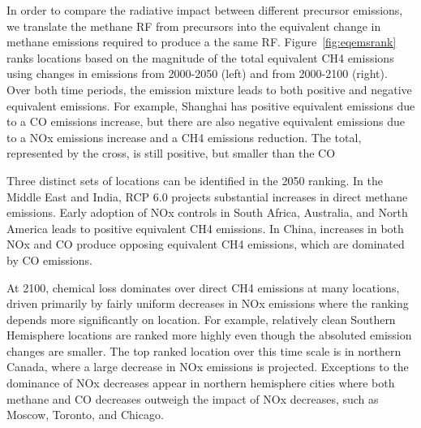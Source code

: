 In order to compare the radiative impact between different precursor emissions, we translate the methane RF from precursors into the equivalent change in methane emissions required to produce a the same RF. Figure~\ref{fig:eqemsrank} ranks locations based on the magnitude of the total equivalent CH4 emissions using changes in emissions from 2000-2050 (left) and from 2000-2100 (right). Over both time periods, the emission  mixture leads to both  positive and negative equivalent emissions. For example, Shanghai has positive equivalent emissions due to a CO emissions increase, but there are also negative equivalent emissions due to a NOx emissions increase and a CH4 emissions reduction. The total, represented by the cross, is still positive, but smaller than the CO 

Three distinct sets of locations can be identified in the 2050 ranking. In the Middle East and India, RCP 6.0 projects substantial increases in direct methane emissions. Early adoption of NOx controls in South Africa, Australia, and North America leads to positive equivalent CH4 emissions. In China, increases in both NOx and CO produce opposing equivalent CH4 emissions, which are dominated by  CO emissions.

At 2100, chemical loss dominates over direct CH4 emissions at many locations, driven primarily by fairly uniform decreases in NOx emissions where the ranking depends more significantly on location. For example,  relatively clean Southern Hemisphere locations are ranked more highly even though the absoluted emission changes are smaller. The top ranked location over this time scale is in northern Canada, where a large decrease in NOx emissions is projected. Exceptions to the dominance of NOx decreases appear in northern hemisphere cities where both methane and CO decreases outweigh the impact of NOx decreases, such as Moscow, Toronto, and Chicago. 

